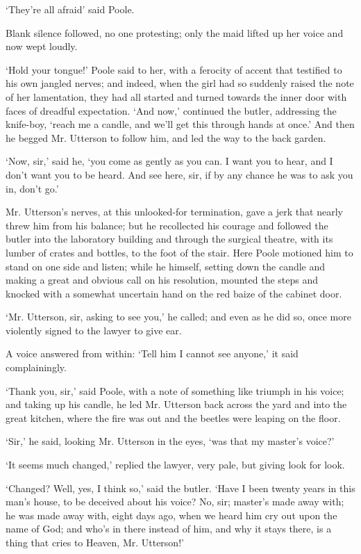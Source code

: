 \documentclass[]{novel}
\begin{document}
‘They’re all afraid’ said Poole.

Blank silence followed, no one protesting; only the maid lifted up her voice and now wept loudly.

‘Hold your tongue!’ Poole said to her, with a ferocity of accent that testified to his own jangled nerves; and indeed, when the girl had so suddenly raised the note of her lamentation, they had all started and turned towards the inner door with faces of dreadful expectation. ‘And now,’ continued the butler, addressing the knife-boy, ‘reach me a candle, and we’ll get this through hands at once.’ And then he begged Mr. Utterson to follow him, and led the way to the back garden.

‘Now, sir,’ said he, ‘you come as gently as you can. I want you to hear, and I don’t want you to be heard. And see here, sir, if by any chance he was to ask you in, don’t go.’

Mr. Utterson’s nerves, at this unlooked-for termination, gave a jerk that nearly threw him from his balance; but he recollected his courage and followed the butler into the laboratory building and through the surgical theatre, with its lumber of crates and bottles, to the foot of the stair. Here Poole motioned him to stand on one side and listen; while he himself, setting down the candle and making a great and obvious call on his resolution, mounted the steps and knocked with a somewhat uncertain hand on the red baize of the cabinet door.

‘Mr. Utterson, sir, asking to see you,’ he called; and even as he did so, once more violently signed to the lawyer to give ear.

A voice answered from within: ‘Tell him I cannot see anyone,’ it said complainingly.

‘Thank you, sir,’ said Poole, with a note of something like triumph in his voice; and taking up his candle, he led Mr. Utterson back across the yard and into the great kitchen, where the fire was out and the beetles were leaping on the floor.

‘Sir,’ he said, looking Mr. Utterson in the eyes, ‘was that my master’s voice?’

‘It seems much changed,’ replied the lawyer, very pale, but giving look for look.

‘Changed? Well, yes, I think so,’ said the butler. ‘Have I been twenty years in this man’s house, to be deceived about his voice? No, sir; master’s made away with; he was made away with, eight days ago, when we heard him cry out upon the name of God; and who’s in there instead of him, and why it stays there, is a thing that cries to Heaven, Mr. Utterson!’
\end{document}
